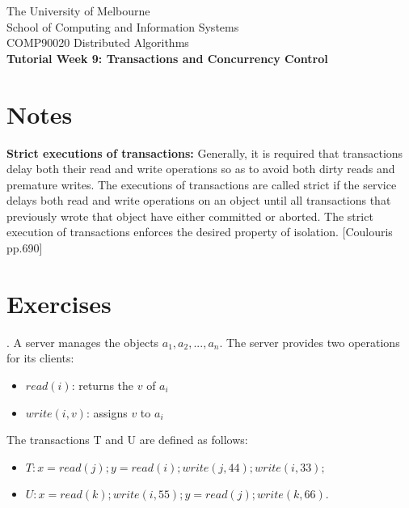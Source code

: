 \documentclass[12pt]{article}
\newcounter{question}
\newcommand{\question}[1]{
    \stepcounter{question}
    \thequestion. #1 \hfill
}
\begin{document}
\begin{center}
    {\sc The University of Melbourne
        \\
        School of Computing and Information Systems
        \\
    COMP90020 Distributed Algorithms}
    \bigskip \\
    {\Large\bf Tutorial Week 9: Transactions and Concurrency Control}
    \bigskip \\
\end{center}

\section*{Notes}


\textbf{Strict executions of transactions:} Generally, it is required that transactions delay both their read and write operations so as to avoid both dirty reads and premature writes. The executions of transactions are called strict if the service delays both read and write operations on an object until all transactions that previously wrote that object have either committed or aborted. The strict execution of transactions enforces the desired property of isolation. [Coulouris pp.690]

\section*{Exercises}

\setcounter{question}{41}

\question{A server manages the objects $a_1, a_2, ..., a_n$. The server provides two operations for its
clients:}

\begin{itemize}
    \item $read (i)$: returns the $v$ of $a_i$
    \item $write(i, v)$: assigns $v$ to $a_i$
\end{itemize}
The transactions T and U are defined as follows:

\begin{itemize}
    \item $T: x = read(j); y = read (i); write(j, 44); write(i, 33);$
    \item $U: x = read(k); write(i, 55); y = read (j); write(k, 66).$
\end{itemize}
\end{document}
